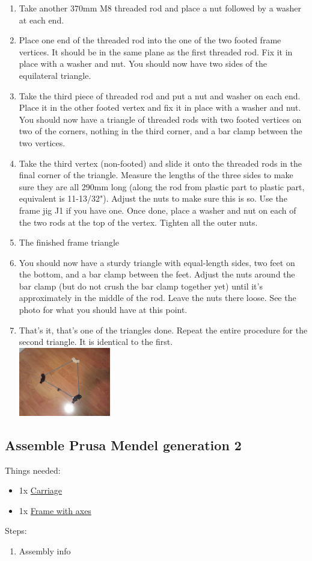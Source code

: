 \documentclass[11pt]{article}
\begin{document}
\begin{enumerate}
\item Take another 370mm M8 threaded rod and place a nut followed by a washer at each end.
\item Place one end of the threaded rod into the one of the two footed frame vertices. It should be in the same plane as the first threaded rod. Fix it in place with a washer and nut. You should now have two sides of the equilateral triangle.
\item Take the third piece of threaded rod and put a nut and washer on each end. Place it in the other footed vertex and fix it in place with a washer and nut. You should now have a triangle of threaded rods with two footed vertices on two of the corners, nothing in the third corner, and a bar clamp between the two vertices.
\item Take the third vertex (non-footed) and slide it onto the threaded rods in the final corner of the triangle. Measure the lengths of the three sides to make sure they are all 290mm long (along the rod from plastic part to plastic part, equivalent is 11-13/32"). Adjust the nuts to make sure this is so. Use the frame jig J1 if you have one. Once done, place a washer and nut on each of the two rods at the top of the vertex. Tighten all the outer nuts.
\item The finished frame triangle
\item You should now have a sturdy triangle with equal-length sides, two feet on the bottom, and a bar clamp between the feet. Adjust the nuts around the bar clamp (but do not crush the bar clamp together yet) until it's approximately in the middle of the rod. Leave the nuts there loose. See the photo for what you should have at this point.
\item That's it, that's one of the triangles done. Repeat the entire procedure for the second triangle. It is identical to the first.\\ \includegraphics[width=4cm]{images/frame/finished-triangle.jpg}
\end{enumerate}

\subsection{Assemble Prusa Mendel generation 2}
Things needed:
\begin{itemize}
\item 1x \hyperlink{thing_carriage}{Carriage}
\item 1x \hyperlink{thing_frame-with-axes}{Frame with axes}
\end{itemize}
Steps:
\begin{enumerate}
\item Assembly info
\end{enumerate}

\newpage
\end{document}
